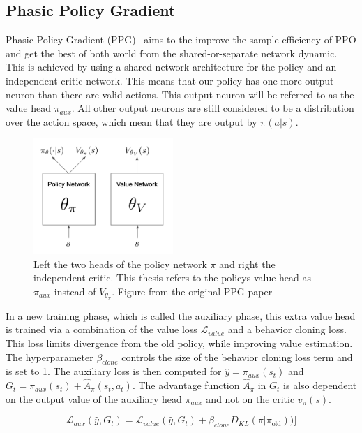 \documentclass{article}
\begin{document}
\subsection{Phasic Policy Gradient}

Phasic Policy Gradient (PPG)~\cite{DBLP:journals/corr/abs-2009-04416} aims to the improve the
sample efficiency of PPO and get the best of both world from the shared-or-separate network
dynamic. This is achieved by using a shared-network architecture for the policy and an independent
critic network. This means that our policy has one more output neuron than there are valid actions.
This output neuron will be referred to as the value head $\pi_{aux}$. All other output neurons are still
considered to be a distribution over the action space, which mean that they are output by $\pi(a|s)$.\\

\begin{figure}[h]
  \centering
  \includegraphics[width = 150pt]{ppg_heads.png}
  \caption{Left the two heads of the policy network $\pi$ and right the independent critic. This thesis refers to the policys value head as $\pi_{aux}$ instead of $V_{\theta_\pi}$. Figure from the original PPG paper~\cite{DBLP:journals/corr/abs-2009-04416}}
\end{figure}

\noindent In a new training phase, which is called the auxiliary phase, this extra value head is trained via
a combination of the value loss $\mathcal{L}_{value}$ and a behavior cloning loss. This loss limits divergence from the
old policy, while improving value estimation. The hyperparameter $\beta_{clone}$ controls
the size of the behavior cloning loss term and is set to 1. The auxiliary loss is then
computed for $\hat y = \pi_{aux}(s_t)$ and $G_t = \pi_{aux}(s_t) + \hat A_\pi(s_t,a_t)$. 
The advantage function $\hat A_\pi$ in $G_t$ is also dependent on the output 
value of the auxiliary head $\pi_{aux}$ and not on the critic $v_\pi(s)$.

\begin{equation}
    \mathcal{L}_{aux}(\hat y, G_t) = \mathcal{L}_{value}(\hat y, G_t) + \beta_{clone}D_{KL}(\pi|\pi_{\text{old}}))]
\end{equation}
\end{document}
